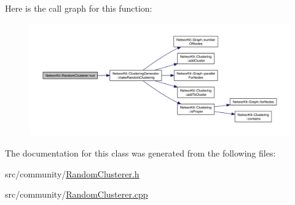 Here is the call graph for this function\-:\nopagebreak
\begin{figure}[H]
\begin{center}
\leavevmode
\includegraphics[width=350pt]{class_networ_kit_1_1_random_clusterer_aee4581477334d009c3d995d5e0e3b1d0_cgraph}
\end{center}
\end{figure}




The documentation for this class was generated from the following files\-:\begin{DoxyCompactItemize}
\item 
src/community/\hyperlink{_random_clusterer_8h}{Random\-Clusterer.\-h}\item 
src/community/\hyperlink{_random_clusterer_8cpp}{Random\-Clusterer.\-cpp}\end{DoxyCompactItemize}
